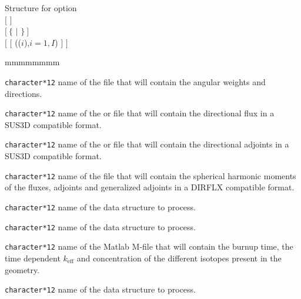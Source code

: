 \begin{enumerate}
\begin{DataStructure}{Structure  for  option}%
 \moc{:=}      \moc{::} \\ 
\hspace{1.0cm} $[$   $]$ \\
\hspace{1.0cm}  $[~\{$  $|$  $\}~]$ \\
\hspace{1.0cm} $[$  $[$ (($i$),$i=1,I$) $]$ $]$ 
\end{DataStructure}

\end{enumerate}

\begin{ListeDeDescription}{mmmmmmmm}

\item[\dusa{WGTANGL}] \verb|character*12| name of the  file that will
contain the angular weights and directions.

\item[\dusa{DFLUX}] \verb|character*12| name of the  or  file that will
contain the directional flux in a SUS3D compatible format.

\item[\dusa{DADJOINTS}] \verb|character*12| name of the  or  file that will contain the directional adjoints in a SUS3D compatible format.

\item[\dusa{DAF}] \verb|character*12| name of the  file that will contain the spherical harmonic moments of the fluxes, adjoints and generalized
adjoints in a DIRFLX compatible format.

\item[\dusa{FLUX}] \verb|character*12| name of the  data structure to process.

\item[\dusa{VOLTRK}] \verb|character*12| name of the  data structure to process.

\item[\dusa{MFILE}] \verb|character*12|  name of the   Matlab M-file that will
contain the burnup time, the time dependent $k_{\text{eff}}$ and concentration of the different isotopes present in the geometry.

\item[\dusa{EDITION}] \verb|character*12| name of the  data structure to process.


\end{ListeDeDescription}
